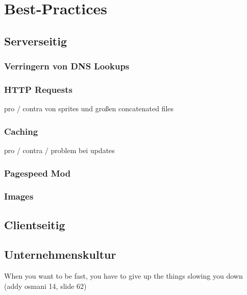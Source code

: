 \section{Best-Practices} %
\label{sec:best_practices}

	\subsection{Serverseitig}
	\label{sub:serverseitig}

		\subsubsection{Verringern von DNS Lookups} %
		\label{ssub:verringern_von_dns_lookups}
		

		\subsubsection{HTTP Requests} %
		\label{ssub:http_requests}
		pro / contra von sprites und großen concatenated files

		\subsubsection{Caching} %
		\label{ssub:caching}
		pro / contra / problem bei updates

		\subsubsection{Pagespeed Mod} %
		\label{ssub:pagespeed_mod}
		

		\subsubsection{Images} %
		\label{ssub:images}





	\subsection{Clientseitig}
	\label{sub:clientseitig}
	

	\subsection{Unternehmenskultur} %
	\label{sub:unternehmenskultur}
	When you want to be fast, you have to give up the things slowing you down (addy osmani 14, slide 62)

\pagebreak